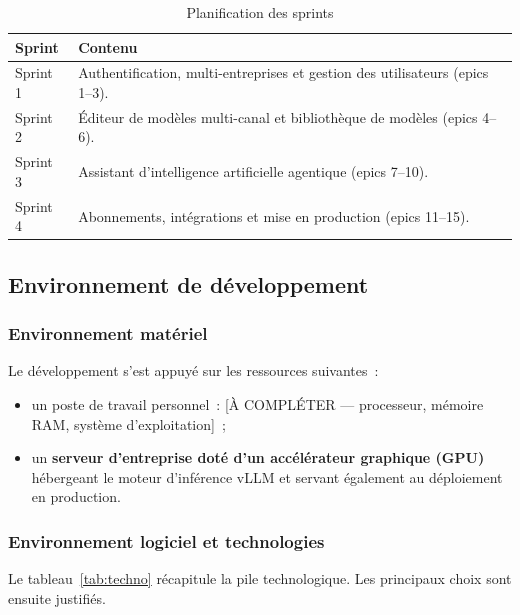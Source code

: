 \begin{table}[H]
\centering
\caption{Planification des sprints}
\label{tab:sprints}
\small
\begin{tabularx}{\linewidth}{lX}
\toprule
\textbf{Sprint} & \textbf{Contenu} \\
\midrule
Sprint 1 & Authentification, multi-entreprises et gestion des utilisateurs (epics 1--3). \\
Sprint 2 & Éditeur de modèles multi-canal et bibliothèque de modèles (epics 4--6). \\
Sprint 3 & Assistant d'intelligence artificielle agentique (epics 7--10). \\
Sprint 4 & Abonnements, intégrations et mise en production (epics 11--15). \\
\bottomrule
\end{tabularx}
\end{table}

\subsection{Environnement de développement}

\subsubsection{Environnement matériel}
Le développement s'est appuyé sur les ressources suivantes~:
\begin{itemize}[leftmargin=1.4cm,nosep]
  \item un poste de travail personnel~: [À COMPLÉTER — processeur, mémoire
  RAM, système d'exploitation]~;
  \item un \textbf{serveur d'entreprise doté d'un accélérateur graphique
  (GPU)} hébergeant le moteur d'inférence vLLM et servant également au
  déploiement en production.
\end{itemize}

\subsubsection{Environnement logiciel et technologies}
Le tableau~\ref{tab:techno} récapitule la pile technologique. Les
principaux choix sont ensuite justifiés.

